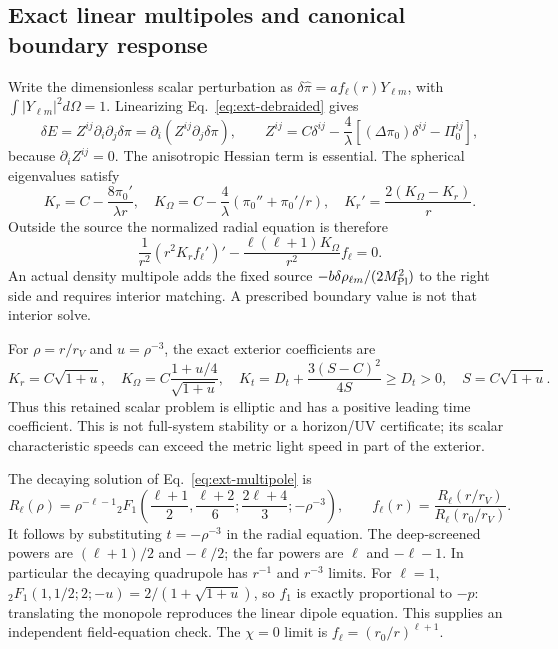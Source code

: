 \subsection{Exact linear multipoles and canonical boundary response}

Write the dimensionless scalar perturbation as
$\delta\widehat\pi=a f_\ell(r)Y_{\ell m}$, with
$\int|Y_{\ell m}|^2d\Omega=1$. Linearizing
Eq.~\eqref{eq:ext-debraided} gives
\begin{equation}
 \delta E=Z^{ij}\partial_i\partial_j\delta\pi
 =\partial_i(Z^{ij}\partial_j\delta\pi),\qquad
 Z^{ij}=C\delta^{ij}-\frac4\lambda
 [(\Delta\pi_0)\delta^{ij}-\Pi_0^{ij}],
 \label{eq:ext-linear-operator}
\end{equation}
because $\partial_iZ^{ij}=0$. The anisotropic Hessian term is essential.
The spherical eigenvalues satisfy
\begin{equation}
 K_r=C-\frac{8\pi_0'}{\lambda r},\quad
 K_\Omega=C-\frac4\lambda(\pi_0''+\pi_0'/r),\quad
 K_r'=\frac{2(K_\Omega-K_r)}r.
\end{equation}
Outside the source the normalized radial equation is therefore
\begin{equation}
 \frac1{r^2}(r^2K_rf_\ell')'
 -\frac{\ell(\ell+1)K_\Omega}{r^2}f_\ell=0.
 \label{eq:ext-multipole}
\end{equation}
An actual density multipole adds the fixed source
$-b\delta\rho_{\ell m}/(2M_{\rm Pl}^2)$ to the right side and requires
interior matching. A prescribed boundary value is not that interior solve.

For $\rho=r/r_V$ and $u=\rho^{-3}$, the exact exterior coefficients are
\begin{equation}
 K_r=C\sqrt{1+u},\quad
 K_\Omega=C\frac{1+u/4}{\sqrt{1+u}},\quad
 K_t=D_t+\frac{3(S-C)^2}{4S}\ge D_t>0,
 \quad S=C\sqrt{1+u}.
 \label{eq:ext-principal}
\end{equation}
Thus this retained scalar problem is elliptic and has a positive leading
time coefficient. This is not full-system stability or a horizon/UV
certificate; its scalar characteristic speeds can exceed the metric
light speed in part of the exterior.

The decaying solution of Eq.~\eqref{eq:ext-multipole} is
\begin{equation}
 R_\ell(\rho)=\rho^{-\ell-1}
 {}_2F_1\!\left(\frac{\ell+1}{2},\frac{\ell+2}{6};
 \frac{2\ell+4}{3};-\rho^{-3}\right),\qquad
 f_\ell(r)=\frac{R_\ell(r/r_V)}{R_\ell(r_0/r_V)}.
 \label{eq:ext-hypergeometric}
\end{equation}
It follows by substituting $t=-\rho^{-3}$ in the radial equation.
The deep-screened powers are $(\ell+1)/2$ and $-\ell/2$;
the far powers are $\ell$ and $-\ell-1$. In particular the decaying
quadrupole has $r^{-1}$ and $r^{-3}$ limits. For $\ell=1$,
${}_2F_1(1,1/2;2;-u)=2/(1+\sqrt{1+u})$, so $f_1$ is exactly
proportional to $-p$: translating the monopole reproduces the linear
dipole equation. This supplies an independent field-equation check.
The $\chi=0$ limit is $f_\ell=(r_0/r)^{\ell+1}$.

